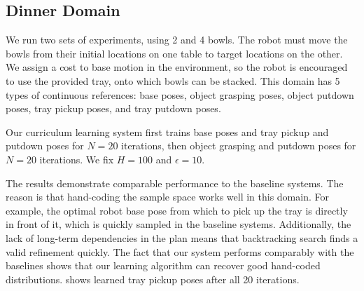 
\subsection{Dinner Domain}
We run two sets of experiments, using 2 and 4 bowls. The robot must move the
bowls from their initial locations on one table to target locations on the other. We assign a cost to
base motion in the environment, so the robot is encouraged to use the provided tray, onto which bowls can be stacked.
This domain has 5 types of continuous references: base poses, object grasping poses, object putdown poses, tray pickup
poses, and tray putdown poses.

Our curriculum learning system first trains base poses and tray pickup and putdown poses for
$N = 20$ iterations, then object grasping and putdown poses for $N = 20$ iterations. We fix $H = 100$ and $\epsilon = 10$.

The results demonstrate comparable performance to the baseline systems. The reason is that
hand-coding the sample space works well in this domain. For example, the optimal
robot base pose from which to pick up the tray is directly in front of it, which is quickly sampled in
the baseline systems. Additionally, the lack of long-term dependencies in the plan
means that backtracking search finds a valid refinement quickly. The fact that our system performs comparably
with the baselines shows that our learning algorithm can recover good hand-coded distributions.
 shows learned tray pickup poses after all 20 iterations.

